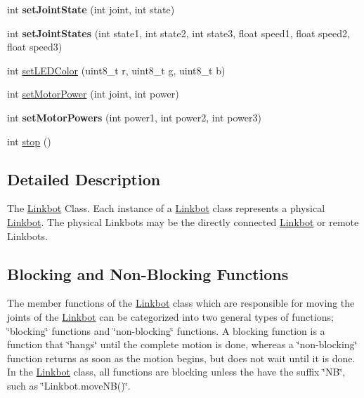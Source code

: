 \begin{DoxyCompactItemize}
\item 
\hypertarget{classLinkbot_ada286ff1ec26af45f78233c54fcbab19}{int {\bfseries set\-Joint\-State} (int joint, int state)}\label{classLinkbot_ada286ff1ec26af45f78233c54fcbab19}

\item 
\hypertarget{classLinkbot_a98cb5715d3ba7c1d0ccf7eccfa75ba2f}{int {\bfseries set\-Joint\-States} (int state1, int state2, int state3, float speed1, float speed2, float speed3)}\label{classLinkbot_a98cb5715d3ba7c1d0ccf7eccfa75ba2f}

\item 
int \hyperlink{classLinkbot_a85fab017fd78c5cf48650f43a77e6518}{set\-L\-E\-D\-Color} (uint8\-\_\-t r, uint8\-\_\-t g, uint8\-\_\-t b)
\item 
int \hyperlink{classLinkbot_a84d6f9a3df6e8b0f90d0765ffaf781b3}{set\-Motor\-Power} (int joint, int power)
\item 
\hypertarget{classLinkbot_a39c154b4e44932b6e786406493e2f982}{int {\bfseries set\-Motor\-Powers} (int power1, int power2, int power3)}\label{classLinkbot_a39c154b4e44932b6e786406493e2f982}

\item 
int \hyperlink{classLinkbot_a1cbfcea580399059ec3d610736b22d0b}{stop} ()
\end{DoxyCompactItemize}


\subsection{Detailed Description}
The \hyperlink{classLinkbot}{Linkbot} Class. Each instance of a \hyperlink{classLinkbot}{Linkbot} class represents a physical \hyperlink{classLinkbot}{Linkbot}. The physical Linkbots may be the directly connected \hyperlink{classLinkbot}{Linkbot} or remote Linkbots.

\subsection*{Blocking and Non-\/\-Blocking Functions}

The member functions of the \hyperlink{classLinkbot}{Linkbot} class which are responsible for moving the joints of the \hyperlink{classLinkbot}{Linkbot} can be categorized into two general types of functions; \char`\"{}blocking\char`\"{} functions and \char`\"{}non-\/blocking\char`\"{} functions. A blocking function is a function that \char`\"{}hangs\char`\"{} until the complete motion is done, whereas a \char`\"{}non-\/blocking\char`\"{} function returns as soon as the motion begins, but does not wait until it is done. In the \hyperlink{classLinkbot}{Linkbot} class, all functions are blocking unless the have the suffix \char`\"{}\-N\-B\char`\"{}, such as \char`\"{}\-Linkbot.\-move\-N\-B()\char`\"{}.

